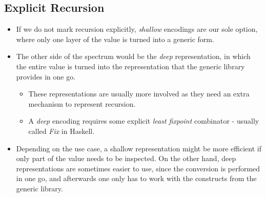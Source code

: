 \subsection{Explicit Recursion}
\begin{itemize}
    \item If we do not mark recursion explicitly, \textit{shallow} encodings are our sole option, where only one layer of the value is turned into a generic form.
    \item The other side of the spectrum would be the \textit{deep} representation, in which the entire value is turned into the representation that the generic library provides in one go. 
    \begin{itemize}
        \item These representations are usually more involved as they need an extra mechanism to represent recursion.
        \item A \textit{deep} encoding requires some explicit \textit{least fixpoint} combinator - usually called \textit{Fix} in Haskell.
    \end{itemize}
    \item Depending on the use case, a shallow representation might be more efficient if only part of the value needs to be inspected. On the other hand, deep representations are sometimes easier to use, since the conversion is performed in one go, and afterwards one only has to work with the constructs from the generic library.
\end{itemize}

